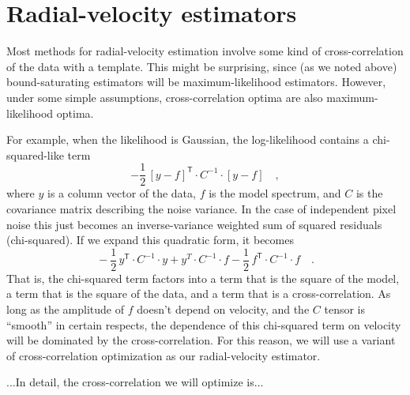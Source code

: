 \documentclass[modern]{aastex62}
\newcommand{\T}{^{\mathsf{T}}}
\begin{document}
\section{Radial-velocity estimators}
\label{s:methods}

Most methods for radial-velocity estimation involve some kind of
cross-correlation of the data with a template.
This might be surprising, since (as we noted above) bound-saturating
estimators will be maximum-likelihood estimators.
However, under some simple assumptions, cross-correlation optima are
also maximum-likelihood optima.

For example, when the likelihood is Gaussian, the log-likelihood
contains a chi-squared-like term
\begin{equation}
-\frac{1}{2}\,[y - f]\T\cdot C^{-1}\cdot [y - f] \quad ,
\end{equation}
where $y$ is a column vector of the data, $f$ is the model spectrum,
and $C$ is the covariance matrix describing the noise variance.
In the case of independent pixel noise this just becomes an
inverse-variance weighted sum of squared residuals (chi-squared).
If we expand this quadratic form, it becomes
\begin{equation}
{}-\frac{1}{2}\,y\T\cdot C^{-1}\cdot y + y^T\cdot C^{-1}\cdot f 
-\frac{1}{2}\,f\T\cdot C^{-1}\cdot f \quad.
\end{equation}
That is, the chi-squared term factors into a term that is the square
of the model, a term that is the square of the data, and a term that
is a cross-correlation.
As long as the amplitude of $f$ doesn't depend on velocity, and the
$C$ tensor is ``smooth'' in certain respects, the dependence of this
chi-squared term on velocity will be dominated by the
cross-correlation.
For this reason, we will use a variant of cross-correlation
optimization as our radial-velocity estimator.

...In detail, the cross-correlation we will optimize is...
\end{document}
